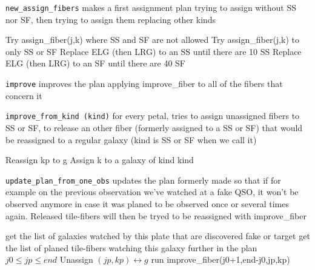 \documentclass[10pt]{extarticle}
\begin{document}
\begin{multicols}{2}
{\tt new\_assign\_fibers} makes a first assignment plan trying to assign without SS nor SF, then trying to assign them replacing other kinds

\begin{algorithm}[H]
	\caption{New\_assign\_fibers(j0,n)}\label{euclid}
	\begin{algorithmic}[1]
		\State Try assign\_fiber(j,k) where SS and SF are not allowed
		\EndFor
		\State Try assign\_fiber(j,k) to only SS or SF
		\EndFor
		\State Replace ELG (then LRG) to an SS until there are 10 SS
		\EndIf
		\State Replace ELG (then LRG) to an SF until there are 40 SF
		\EndIf
		\EndFor
		\EndFor
	\end{algorithmic}
\end{algorithm}

{\tt improve} improves the plan applying improve\_fiber to all of the fibers that concern it

{\tt improve\_from\_kind (kind)} for every petal, tries to assign unassigned fibers to SS or SF, to release an other fiber (formerly assigned to a SS or SF) that would be reassigned to a regular galaxy (kind is SS or SF when we call it)

\begin{algorithm}[H]
	\caption{Improve\_from\_kind (kind,j0,n)}\label{euclid}
	\begin{algorithmic}[1]
		\State Reassign kp to g
		\State Assign k to a galaxy of kind kind
		\EndIf
		\EndFor
		\EndFor
		\EndFor
		\EndFor
		\EndFor
	\end{algorithmic}
\end{algorithm}

{\tt update\_plan\_from\_one\_obs} updates the plan formerly made so that if for example on the previous observation we've watched at a fake QSO, it won't be observed anymore in case it was planed to be observed once or several times again. Released tile-fibers will then be tryed to be reassigned with improve\_fiber

\begin{algorithm}[H]
	\caption{Update\_plan\_from\_one\_observation(j0,end\_plan)}\label{euclid}
	\begin{algorithmic}[1]
		\State get the list of galaxies watched by this plate that are discovered fake or target
		\State get the list of planed tile-fibers watching this galaxy further in the plan $j0\le jp \le end$
		\State Unassign $(jp,kp) \longleftrightarrow g$
		\State run improve\_fiber(j0+1,end-j0,jp,kp)
		\EndFor
		\EndFor
	\end{algorithmic}
\end{algorithm}



\end{multicols}
\end{document}
